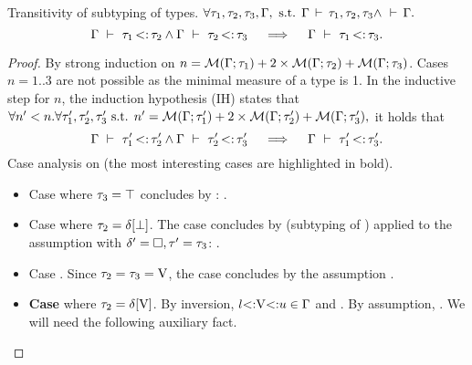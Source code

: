 \begin{theorem}{Transitivity of subtyping of types.}\label{thm:sub-ty-trans}
    $\forall \tau_1, \tau_2, \tau_3, \Gamma, \text{ s.t. }
    \Gamma\,\vdash\,\tau_1, \tau_2, \tau_3 \land \,\,\vdash\,\Gamma.$
    \[
        \Gamma\ \vdash\ \tau_1 \operatorname{<:} \tau_2 \land \Gamma\ \vdash\ \tau_2 \operatorname{<:} \tau_3
        \quad\implies\quad
        \Gamma\ \vdash\ \tau_1 \operatorname{<:} \tau_3.
    \]
\end{theorem}
\begin{proof}
    By strong induction on
    $n = \operatorname{\mathcal{M}}(\Gamma;\tau_1) + 2\times\operatorname{\mathcal{M}}(\Gamma;\tau_2) + \operatorname{\mathcal{M}}(\Gamma;\tau_3)$.
    Cases $n = 1..3$ are not possible as the minimal measure of a type is 1.
    In the inductive step for $n$, the induction hypothesis (IH) states that
    $\forall n'<n. \forall \tau'_1, \tau'_2, \tau'_3 \text{ s.t. }
    n' = \operatorname{\mathcal{M}}(\Gamma;\tau'_1) + 2\times\operatorname{\mathcal{M}}(\Gamma;\tau'_2) + \operatorname{\mathcal{M}}(\Gamma;\tau'_3),$
    it holds that
    \[
        \Gamma\ \vdash\ \tau'_1 \operatorname{<:} \tau'_2 \land \Gamma\ \vdash\ \tau'_2 \operatorname{<:} \tau'_3
        \quad\implies\quad
        \Gamma\ \vdash\ \tau'_1 \operatorname{<:} \tau'_3.
    \]
    Case analysis on  (the most interesting cases are
    highlighted in bold).
    \begin{itemize}
        \item Case   where $\tau_3 = \top$
            concludes by : .
        \item Case  
            where $\tau_2=\delta[\bot]$.
            The case concludes by 
            (subtyping of \tybot) applied
            to the assumption 
            with $\delta' = \square, \tau' = \tau_3$:
            .
        \item Case  \subtydflt{\vany}{\vany}.
            Since $\tau_2=\tau_3=\mathrm{V}$, the case concludes by the assumption
            .
        \item \textbf{Case }  
            where $\tau_2 = \delta[\mathrm{V}]$.
            By inversion, $l{\operatorname{<:}}\mathrm{V}{\operatorname{<:}}u \in \Gamma$ and
            .
            By assumption, .
            We will need the following auxiliary fact.


\end{itemize}
\end{proof}
